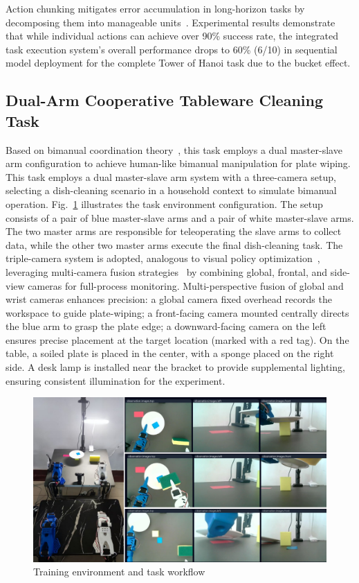 \documentclass[runningheads]{llncs}
\begin{document}
\noindent Action chunking mitigates error accumulation in long-horizon tasks by decomposing them into manageable units~\cite{ref10}. Experimental results demonstrate that while individual actions can achieve over 90\% success rate, the integrated task execution system's overall performance drops to 60\% (6/10) in sequential model deployment for the complete Tower of Hanoi task due to the bucket effect.

\subsection{Dual-Arm Cooperative Tableware Cleaning Task}
Based on bimanual coordination theory~\cite{ref11}, this task employs a dual master-slave arm configuration to achieve human-like bimanual manipulation for plate wiping. This task employs a dual master-slave arm system with a three-camera setup, selecting a dish-cleaning scenario in a household context to simulate bimanual operation. Fig.~\ref{fig9} illustrates the task environment configuration. The setup consists of a pair of blue master-slave arms and a pair of white master-slave arms. The two master arms are responsible for teleoperating the slave arms to collect data, while the other two master arms execute the final dish-cleaning task. The triple-camera system is adopted, analogous to visual policy optimization~\cite{ref12}, leveraging multi-camera fusion strategies~\cite{ref13} by combining global, frontal, and side-view cameras for full-process monitoring. Multi-perspective fusion of global and wrist cameras enhances precision: a global camera fixed overhead records the workspace to guide plate-wiping; a front-facing camera mounted centrally directs the blue arm to grasp the plate edge; a downward-facing camera on the left ensures precise placement at the target location (marked with a red tag). On the table, a soiled plate is placed in the center, with a sponge placed on the right side. A desk lamp is installed near the bracket to provide supplemental lighting, ensuring consistent illumination for the experiment.

\begin{figure}
\centering
\includegraphics[width=\textwidth]{fig9.pdf}
\caption{ Training environment and task workflow} \label{fig9}
\end{figure}
\end{document}
